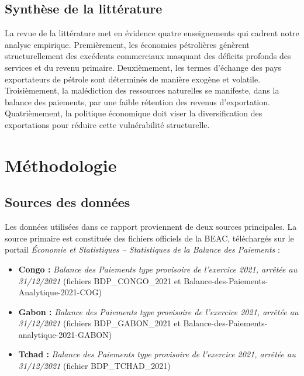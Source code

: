 \documentclass[12pt,a4paper]{article}
\begin{document}
\subsection{Synthèse de la littérature}

La revue de la littérature met en évidence quatre enseignements qui cadrent notre analyse
empirique. Premièrement, les économies pétrolières génèrent structurellement des excédents
commerciaux masquant des déficits profonds des services et du revenu primaire. Deuxièmement,
les termes d'échange des pays exportateurs de pétrole sont déterminés de manière exogène
et volatile. Troisièmement, la malédiction des ressources naturelles se manifeste, dans la
balance des paiements, par une faible rétention des revenus d'exportation. Quatrièmement,
la politique économique doit viser la diversification des exportations pour réduire cette
vulnérabilité structurelle.

\section{Méthodologie}

\subsection{Sources des données}

Les données utilisées dans ce rapport proviennent de deux sources principales. La source
primaire est constituée des fichiers officiels de la BEAC, téléchargés sur le portail
\textit{Économie et Statistiques -- Statistiques de la Balance des Paiements} :

\begin{itemize}
  \item \textbf{Congo :} \textit{Balance des Paiements type provisoire de l'exercice 2021,
        arrêtée au 31/12/2021} (fichiers BDP\_CONGO\_2021 et Balance-des-Paiements-Analytique-2021-COG)
  \item \textbf{Gabon :} \textit{Balance des Paiements type provisoire de l'exercice 2021,
        arrêtée au 31/12/2021} (fichiers BDP\_GABON\_2021 et Balance-des-Paiements-analytique-2021-GABON)
  \item \textbf{Tchad :} \textit{Balance des Paiements type provisoire de l'exercice 2021,
        arrêtée au 31/12/2021} (fichier BDP\_TCHAD\_2021)
\end{itemize}
\end{document}
